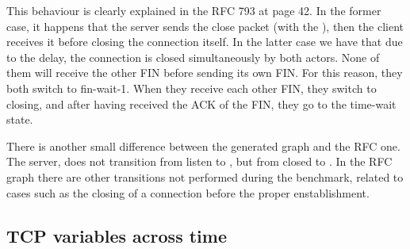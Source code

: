 \documentclass[a4paper,10pt]{article}
\begin{document}
This behaviour is clearly explained in the RFC 793\cite{postel_transmission_nodate} at page 42. In the former case, it happens that the server sends the close packet (with the ), then the client receives it before closing the connection itself.
In the latter case we have that due to the delay, the connection is closed simultaneously by both actors. None of them will receive the other FIN before sending its own FIN. For this reason, they both switch to fin-wait-1. When they receive each other FIN, they switch to closing, and after having received the ACK of the FIN, they go to the time-wait state.

There is another small difference between the generated graph and the RFC one. The server, does not transition from listen to , but from closed to . In the RFC graph there are other transitions not performed during the benchmark, related to cases such as the closing of a connection before the proper enstablishment.



\subsection{TCP variables across time}
\end{document}
